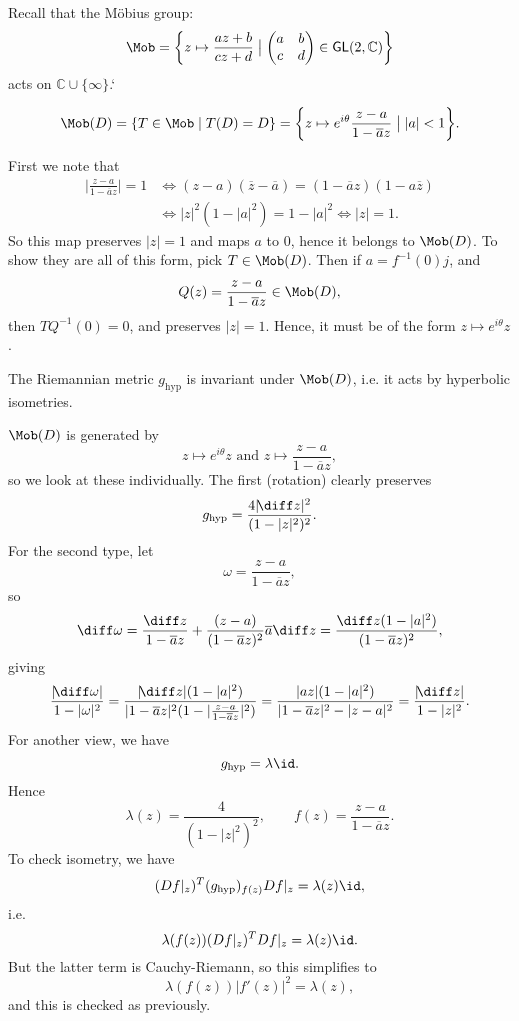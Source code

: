\documentclass[12pt]{article}
\begin{document}
Recall that the M\"{o}bius group:
\[
	\Mob = \biggl\{ z \mapsto \frac{az + b}{cz + d} \bigm|
	\begin{pmatrix}
		a & b \\ c & d
	\end{pmatrix}
\in \mathsf{GL}(2, \mathbb{C})\biggr\}
\]
acts on $\mathbb{C} \cup \{\infty\}$.`

\begin{lemma}
	\[
		\Mob(D) = \{T \in \Mob \mid T(D) = D\} = \biggl\{ z \mapsto e^{i \theta} \frac{z - a}{1 - \overline{a} z} \bigm| |a| < 1 \biggr\}.
	\]
\end{lemma}

\begin{proofbox}
	First we note that
	\begin{align*}
		\biggl| \frac{z - a}{1 - \overline{a}z} \biggr| = 1 &\iff (z - a)(\overline{z} - \overline{a}) = (1 - \overline{a}z)(1 - a\overline{z}) \\
								    &\iff |z|^2(1 - |a|^2) = 1 - |a|^2 \iff |z| = 1.
	\end{align*}
	So this map preserves $|z| = 1$ and maps $a$ to $0$, hence it belongs to $\Mob(D)$. To show they are all of this form, pick $T \in \Mob(D)$. Then if $a = f^{-1}(0)j$, and
	\[
	Q(z) = \frac{z - a}{1 - \overline{a}z} \in \Mob(D),
	\]
	then $TQ^{-1}(0) = 0$, and preserves $|z| = 1$. Hence, it must be of the form $z \mapsto e^{i\theta}z$.
\end{proofbox}

\begin{lemma}
	The Riemannian metric $g_{\mathrm{hyp}}$ is invariant under $\Mob(D)$, i.e. it acts by hyperbolic isometries.
\end{lemma}

\begin{proofbox}
	$\Mob(D)$ is generated by
	\[
		z \mapsto e^{i \theta}z \text{ and } z \mapsto \frac{z - a}{1 - \overline{a}z},
	\]
	so we look at these individually. The first (rotation) clearly preserves
	\[
		g_{\mathrm{hyp}} = \frac{4 |\!\diff z|^2}{(1 - |z|^2)^2}.
	\]
	For the second type, let
	\[
	\omega = \frac{z - a}{1 - \overline{a}z},
	\]
	so
	\[
	\diff \omega = \frac{\diff z}{1 - \overline{a}z} + \frac{(z - a)}{(1 - \overline{a}z)^2} \overline{a} \diff z = \frac{\diff z(1 - |a|^2)}{(1 - \overline{a}z)^2},
	\]
	giving
	\[
	\frac{|\!\diff \omega|}{1 - |\omega|^2} = \frac{|\!\diff z|(1 - |a|^2)}{|1 - \overline{a}z|^2 (1 - |\frac{z-a}{1 - \overline{a}z}|^2)} = \frac{|az|(1 - |a|^2)}{|1 - \overline{a}z|^2 - |z-a|^2} = \frac{|\!\diff z|}{1 - |z|^2}.
	\]
	For another view, we have
	\[
		g_{\mathrm{hyp}} = \lambda \id.
	\]
	Hence
	\[
	\lambda(z) = \frac{4}{(1 - |z|^2)^2}, \qquad f(z) = \frac{z - a}{1 - \overline{a}z}.
	\]
	To check isometry, we have
	\[
		(Df|_z)^{T}(g_{\mathrm{hyp}})_{f(z)}Df|_z = \lambda(z) \id,
	\]
	i.e.
	\[
	\lambda(f(z))(Df|_z)^{T}Df|_z = \lambda(z) \id.
	\]
	But the latter term is Cauchy-Riemann, so this simplifies to
	\[
	\lambda(f(z))|f'(z)|^2 = \lambda(z),
	\]
	and this is checked as previously.
\end{proofbox}
\end{document}
